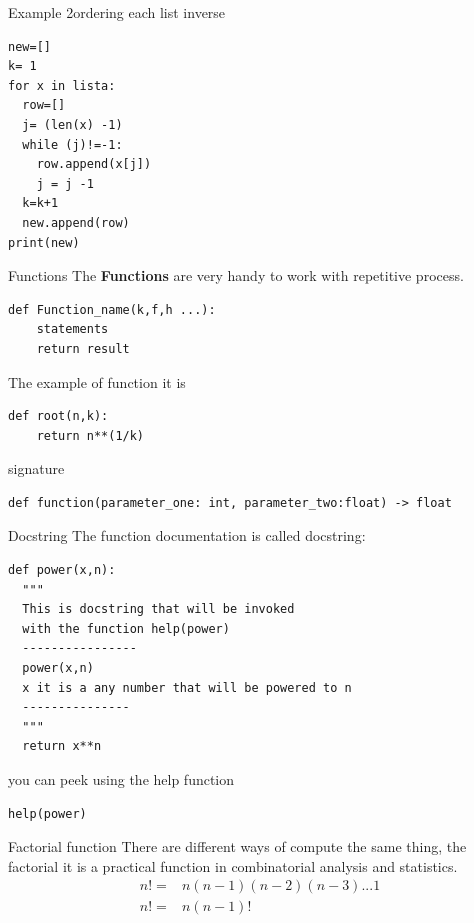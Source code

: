 \documentclass{beamer}
\begin{document}
\begin{frame}[fragile]{Example 2}{ordering each list inverse}
\begin{lstlisting}
new=[]
k= 1
for x in lista:
  row=[]
  j= (len(x) -1) 
  while (j)!=-1:
    row.append(x[j])
    j = j -1
  k=k+1    
  new.append(row)
print(new)
\end{lstlisting}
\end{frame}





\begin{frame}[fragile]{Functions}
The \textbf{Functions} are very handy to work with repetitive process.

\begin{lstlisting}
def Function_name(k,f,h ...):
	statements 
	return result 
\end{lstlisting}
The example of function  it is 
\begin{lstlisting}
def root(n,k):
	return n**(1/k)
\end{lstlisting}
\end{frame}


\begin{frame}[fragile]{signature}
\begin{lstlisting}
def function(parameter_one: int, parameter_two:float) -> float
\end{lstlisting}
\end{frame}


\begin{frame}[fragile]{Docstring}
The function documentation is called docstring:
\begin{lstlisting}
def power(x,n):
  """
  This is docstring that will be invoked 
  with the function help(power)
  ----------------
  power(x,n)
  x it is a any number that will be powered to n
  ---------------
  """
  return x**n
\end{lstlisting}
you can peek using the help function
\begin{lstlisting}
help(power)
\end{lstlisting}
\end{frame}



\begin{frame}{Factorial function}
There are different ways of compute the same thing, the factorial it is a practical function in combinatorial analysis and statistics.
\begin{equation}
\begin{split}
n! =& n(n-1)(n-2)(n-3)...1 \\
n! =&n(n-1)!
\end{split}
\end{equation}
\end{frame}
\end{document}
